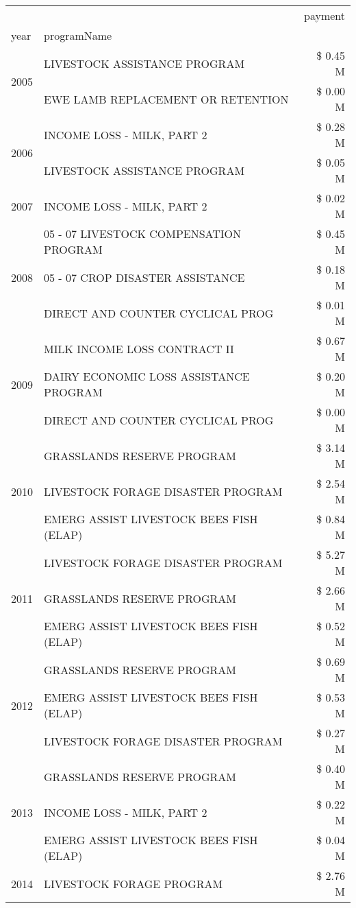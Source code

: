\begin{tabular}{llr}
\toprule
 &  & payment \\
year & programName &  \\
\midrule
\multirow[t]{2}{*}{2005} & LIVESTOCK ASSISTANCE PROGRAM & \$ 0.45 M \\
 & EWE LAMB REPLACEMENT OR RETENTION & \$ 0.00 M \\
\cline{1-3}
\multirow[t]{2}{*}{2006} & INCOME LOSS - MILK, PART 2 & \$ 0.28 M \\
 & LIVESTOCK ASSISTANCE PROGRAM & \$ 0.05 M \\
\cline{1-3}
2007 & INCOME LOSS - MILK, PART 2 & \$ 0.02 M \\
\cline{1-3}
\multirow[t]{3}{*}{2008} & 05 - 07 LIVESTOCK COMPENSATION PROGRAM & \$ 0.45 M \\
 & 05 - 07 CROP DISASTER ASSISTANCE & \$ 0.18 M \\
 & DIRECT AND COUNTER CYCLICAL PROG & \$ 0.01 M \\
\cline{1-3}
\multirow[t]{3}{*}{2009} & MILK INCOME LOSS CONTRACT II & \$ 0.67 M \\
 & DAIRY ECONOMIC LOSS ASSISTANCE PROGRAM & \$ 0.20 M \\
 & DIRECT AND COUNTER CYCLICAL PROG & \$ 0.00 M \\
\cline{1-3}
\multirow[t]{3}{*}{2010} & GRASSLANDS RESERVE PROGRAM & \$ 3.14 M \\
 & LIVESTOCK FORAGE DISASTER PROGRAM & \$ 2.54 M \\
 & EMERG ASSIST LIVESTOCK BEES FISH (ELAP) & \$ 0.84 M \\
\cline{1-3}
\multirow[t]{3}{*}{2011} & LIVESTOCK FORAGE DISASTER PROGRAM & \$ 5.27 M \\
 & GRASSLANDS RESERVE PROGRAM & \$ 2.66 M \\
 & EMERG ASSIST LIVESTOCK BEES FISH (ELAP) & \$ 0.52 M \\
\cline{1-3}
\multirow[t]{3}{*}{2012} & GRASSLANDS RESERVE PROGRAM & \$ 0.69 M \\
 & EMERG ASSIST LIVESTOCK BEES FISH (ELAP) & \$ 0.53 M \\
 & LIVESTOCK FORAGE DISASTER PROGRAM & \$ 0.27 M \\
\cline{1-3}
\multirow[t]{3}{*}{2013} & GRASSLANDS RESERVE PROGRAM & \$ 0.40 M \\
 & INCOME LOSS - MILK, PART 2 & \$ 0.22 M \\
 & EMERG ASSIST LIVESTOCK BEES FISH (ELAP) & \$ 0.04 M \\
\cline{1-3}
\multirow[t]{3}{*}{2014} & LIVESTOCK FORAGE PROGRAM & \$ 2.76 M \\

\end{tabular}

